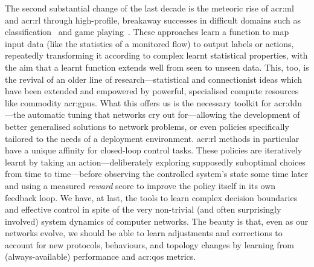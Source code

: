The second substantial change of the last decade is the meteoric rise of \gls{acr:ml} and \gls{acr:rl} through high-profile, breakaway successes in difficult domains such as classification~\parencite{DBLP:conf/cvpr/HeZRS16} and game playing~\parencite{DBLP:journals/corr/abs-1912-06680,DBLP:journals/nature/SilverSSAHGHBLB17}.
These approaches learn a function to map input data (like the statistics of a monitored flow) to output labels or actions, repeatedly transforming it according to complex learnt statistical properties, with the aim that a learnt function extends well from seen to unseen data.
This, too, is the revival of an older line of research---statistical and connectionist ideas which have been extended and empowered by powerful, specialised compute resources like commodity \glspl{acr:gpu}.
What this offers us is the necessary toolkit for \gls{acr:ddn}---the automatic tuning that networks cry out for---allowing the development of better generalised solutions to network problems, or even policies specifically tailored to the needs of a deployment environment.
\gls{acr:rl} methods in particular have a unique affinity for closed-loop control tasks.
These policies are iteratively learnt by taking an action---deliberately exploring supposedly suboptimal choices from time to time---before observing the controlled system's state some time later and using a measured \emph{reward} score to improve the policy itself in its own feedback loop.
We have, at last, the tools to learn complex decision boundaries and effective control in spite of the very non-trivial (and often surprisingly involved) system dynamics of computer networks.
The beauty is that, even as our networks evolve, we should be able to learn adjustments and corrections to account for new protocols, behaviours, and topology changes by learning from (always-available) performance and \gls{acr:qos} metrics.

